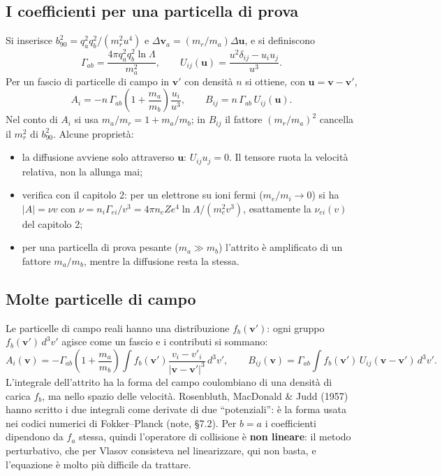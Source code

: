 \subsection{I coefficienti per una particella di prova}
Si inserisce $b_{90}^2=q_a^2q_b^2/(m_r^2u^4)$ e $\Delta\mathbf{v}_a=(m_r/m_a)\Delta\mathbf{u}$, e si definiscono
\begin{equation}
\Gamma_{ab}=\frac{4\pi q_a^2q_b^2\ln\Lambda}{m_a^2},\qquad U_{ij}(\mathbf{u})=\frac{u^2\delta_{ij}-u_iu_j}{u^3}.
\end{equation}
Per un fascio di particelle di campo in $\mathbf{v}'$ con densità $n$ si ottiene, con $\mathbf{u}=\mathbf{v}-\mathbf{v}'$,
\begin{equation}
A_i=-n\,\Gamma_{ab}\left(1+\frac{m_a}{m_b}\right)\frac{u_i}{u^3},\qquad B_{ij}=n\,\Gamma_{ab}\,U_{ij}(\mathbf{u}).
\end{equation}
Nel conto di $A_i$ si usa $m_a/m_r=1+m_a/m_b$; in $B_{ij}$ il fattore $(m_r/m_a)^2$ cancella il $m_r^2$ di $b_{90}^2$. Alcune proprietà:
\begin{itemize}
\item la diffusione avviene solo attraverso $\mathbf{u}$: $U_{ij}u_j=0$. Il tensore ruota la velocità relativa, non la allunga mai;
\item verifica con il capitolo 2: per un elettrone su ioni fermi ($m_e/m_i\to0$) si ha $|A|=\nu v$ con $\nu=n_i\Gamma_{ei}/v^3=4\pi n_eZe^4\ln\Lambda/(m_e^2v^3)$, esattamente la $\nu_{ei}(v)$ del capitolo 2;
\item per una particella di prova pesante ($m_a\gg m_b$) l'attrito è amplificato di un fattore $m_a/m_b$, mentre la diffusione resta la stessa.
\end{itemize}

\subsection{Molte particelle di campo}
Le particelle di campo reali hanno una distribuzione $f_b(\mathbf{v}')$: ogni gruppo $f_b(\mathbf{v}')\,d^3v'$ agisce come un fascio e i contributi si sommano:
\begin{equation}
A_i(\mathbf{v})=-\Gamma_{ab}\left(1+\frac{m_a}{m_b}\right)\int f_b(\mathbf{v}')\frac{v_i-v'_i}{|\mathbf{v}-\mathbf{v}'|^3}\,d^3v',\qquad
B_{ij}(\mathbf{v})=\Gamma_{ab}\int f_b(\mathbf{v}')\,U_{ij}(\mathbf{v}-\mathbf{v}')\,d^3v'.
\end{equation}
L'integrale dell'attrito ha la forma del campo coulombiano di una densità di carica $f_b$, ma nello spazio delle velocità. Rosenbluth, MacDonald \& Judd (1957) hanno scritto i due integrali come derivate di due ``potenziali'': è la forma usata nei codici numerici di Fokker--Planck (note, \S7.2). Per $b=a$ i coefficienti dipendono da $f_a$ stessa, quindi l'operatore di collisione è \textbf{non lineare}: il metodo perturbativo, che per Vlasov consisteva nel linearizzare, qui non basta, e l'equazione è molto più difficile da trattare.

